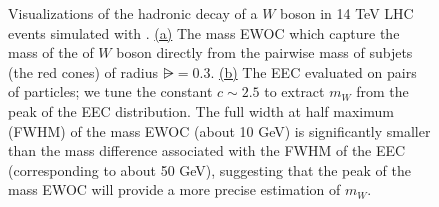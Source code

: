 \begin{figure}
{        \label{fig:m_ewoc:pp_to_ww:with_cartoon}
    }
    \hspace{10em}
    \caption[The mass EWOC and EEC calculated on the hadronic decay of a \(W\) boson in 14 TeV LHC events simulated with \pythia{}.]{
        Visualizations of the hadronic decay of a \(W\) boson in 14 TeV LHC events simulated with \pythia{}.
        \hyperref[fig:m_ewoc:pp_to_ww:with_cartoon]{(a)}
        The mass EWOC which capture the mass of the of \(W\) boson directly from the pairwise mass of subjets (the red cones) of radius \(\rsub=0.3\).
        \hyperref[fig:eec:pp_to_ww:with_cartoon]{(b)}
        The EEC evaluated on pairs of particles;
        we tune the constant \(c \sim 2.5\) to extract \(m_W\) from the peak of the EEC distribution.
        The full width at half maximum (FWHM) of the mass EWOC (about 10 GeV) is significantly smaller than the mass difference associated with the FWHM of the EEC (corresponding to about 50 GeV),
        suggesting that the peak of the mass EWOC will provide a more precise estimation of \(m_W\).
    }
    \label{fig:EWOCs:visualization}
\end{figure}



